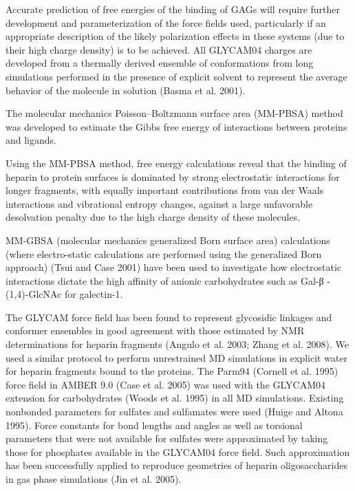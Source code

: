 \documentclass[journal=jacsat,manuscript=article]{achemso}
\begin{document}
Accurate prediction of free energies of the binding of GAGs will require further development and parameterization of the force fields used, particularly if an appropriate description of the likely polarization effects in these systems (due to their high charge density) is to be achieved. All GLYCAM04 charges are developed from a thermally derived ensemble of conformations from long simulations performed in the presence of explicit solvent to represent the average behavior of the molecule in solution (Basma et al. 2001). \cite{Gandi2009}

The  molecular  mechanics  Poisson–Boltzmann  surface  area (MM-PBSA) method was developed to estimate the Gibbs free energy of interactions between proteins and ligands. \cite{Gandi2009}

Using the MM-PBSA method, free  energy  calculations  reveal  that  the  binding  of  heparin  to  protein  surfaces  is  dominated  by  strong  electrostatic  interactions  for  longer  fragments,  with  equally  important contributions from van der Waals interactions and vibrational  entropy  changes,  against  a  large  unfavorable desolvation penalty due to the high charge density of these molecules. \cite{Gandi2009}

MM-GBSA (molecular mechanics generalized  Born  surface  area)  calculations  (where  electro-static  calculations  are  performed  using  the  generalized  Born approach) (Tsui and Case 2001) have been used to investigate how electrostatic interactions dictate the high affinity of anionic carbohydrates  such  as  Gal-β -(1,4)-GlcNAc  for  galectin-1.  \cite{Gandi2009}

The GLYCAM force field has been found to represent glycosidic linkages and conformer ensembles in good agreement with those estimated by NMR determinations for heparin fragments (Angulo et al. 2003; Zhang et al. 2008). We used a similar protocol to perform unrestrained MD simulations in explicit water for heparin fragments bound to the proteins. The Parm94 (Cornell et al. 1995) force field in AMBER 9.0 (Case et al. 2005) was used with the GLYCAM04 extension for carbohydrates (Woods et al. 1995) in all MD simulations. Existing nonbonded parameters for sulfates and sulfamates were used (Huige and Altona 1995). Force constants for bond lengths and angles as well as torsional parameters that were not available for sulfates were approximated by taking those for phosphates available in the GLYCAM04 force field. Such approximation has been successfully applied to reproduce geometries of heparin oligosaccharides in gas phase simulations (Jin et al. 2005). \cite{Gandi2009} 
\end{document}
